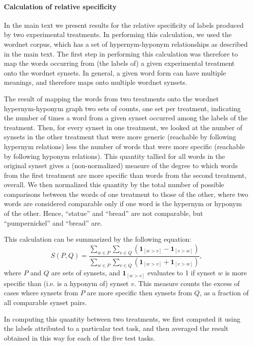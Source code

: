 \documentclass[12pt]{article}
\begin{document}
\paragraph{Calculation of relative specificity}
In the main text we present results for the relative specificity of labels
produced by two experimental treatments.  In performing this calculation,
we used the wordnet corpus, which has a set of hypernym-hyponym relationships
as described in the main text.  The first step in performing this calculation
was therefore to map the words occurring from (the labels of) a given 
experimental treatment onto the wordnet synsets.  In general, a given word
form can have multiple meanings, and therefore maps onto multiple wordnet 
synsets.

The result of mapping the words from two treatments onto the wordnet 
hypernym-hyponym graph two sets of counts, one set per treatment, 
indicating the number of times a word from a given synset occurred among the
labels of the treatment.  Then, for every synset in one treatment, we looked
at the number of synsets in the other treatment that were more generic
(reachable by following hypernym relations) less the number of words that
were more specific (reachable by following hyponym relations).  This quantity
tallied for all words in the original synset gives a (non-normalized) measure
of the degree to which words from the first treatment are more specific
than words from the second treatment, overall.  We then normalized this 
quantity by the total number of possible comparisons between the words of
one treatment to those of the other, where two words are considered comparable
only if one word is the hypernym or hyponym of the other.  Hence, ``statue'' 
and ``bread'' are not comparable, but ``pumpernickel'' and ``bread'' are.

This calculation can be summarized by the following equation:
\begin{equation}
	S(P,Q) = \frac{
		\sum_{w\in P}\sum_{v\in Q} \left(
			\mathbf{1}_{[w>v]} - \mathbf{1}_{[v>w]} \right)
	}{
		\sum_{w\in P}\sum_{v\in Q} \left(
			\mathbf{1}_{[w>v]} + \mathbf{1}_{[v>w]} \right)
	},
\end{equation}
where $P$ and $Q$ are sets of synsets, and $\mathbf{1}_{[w>v]}$ evaluates
to 1 if synset $w$ is more specific than (i.e. is a hyponym of) synset $v$.
This measure counts the excess of cases where synsets from $P$ are more
specific then synsets from $Q$, as a fraction of all comparable synset pairs. 

In computing this quantity between two treatments, we first computed it 
using the labels attributed to a particular test task, and then
averaged the result obtained in this way for each of the five test tasks.
\end{document}
